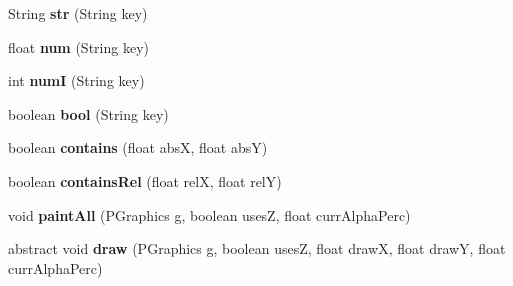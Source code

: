 \begin{DoxyCompactItemize}
\item 
\hypertarget{classhype_1_1drawable_1_1_h_drawable_a0d2393ad2936ee21fbb73fe8044f8c03}{String {\bfseries str} (String key)}\label{classhype_1_1drawable_1_1_h_drawable_a0d2393ad2936ee21fbb73fe8044f8c03}

\item 
\hypertarget{classhype_1_1drawable_1_1_h_drawable_aaafb5307820159466ebf60658c7a325d}{float {\bfseries num} (String key)}\label{classhype_1_1drawable_1_1_h_drawable_aaafb5307820159466ebf60658c7a325d}

\item 
\hypertarget{classhype_1_1drawable_1_1_h_drawable_a78a4cb7304e24e1706d9f23d0a387b43}{int {\bfseries num\-I} (String key)}\label{classhype_1_1drawable_1_1_h_drawable_a78a4cb7304e24e1706d9f23d0a387b43}

\item 
\hypertarget{classhype_1_1drawable_1_1_h_drawable_a138a8d2253dbfccb39889cb01b452f7c}{boolean {\bfseries bool} (String key)}\label{classhype_1_1drawable_1_1_h_drawable_a138a8d2253dbfccb39889cb01b452f7c}

\item 
\hypertarget{classhype_1_1drawable_1_1_h_drawable_a6662671b3f2c3f96cdd8883e0eb21fd6}{boolean {\bfseries contains} (float abs\-X, float abs\-Y)}\label{classhype_1_1drawable_1_1_h_drawable_a6662671b3f2c3f96cdd8883e0eb21fd6}

\item 
\hypertarget{classhype_1_1drawable_1_1_h_drawable_a40eaa02f8f52fc6891d77affe8b8f146}{boolean {\bfseries contains\-Rel} (float rel\-X, float rel\-Y)}\label{classhype_1_1drawable_1_1_h_drawable_a40eaa02f8f52fc6891d77affe8b8f146}

\item 
\hypertarget{classhype_1_1drawable_1_1_h_drawable_a54e5a75afb23f49b37ce769a11d10fb0}{void {\bfseries paint\-All} (P\-Graphics g, boolean uses\-Z, float curr\-Alpha\-Perc)}\label{classhype_1_1drawable_1_1_h_drawable_a54e5a75afb23f49b37ce769a11d10fb0}

\item 
\hypertarget{classhype_1_1drawable_1_1_h_drawable_a8e0af2cfaa89a93b3dab6b5f0ecdf964}{abstract void {\bfseries draw} (P\-Graphics g, boolean uses\-Z, float draw\-X, float draw\-Y, float curr\-Alpha\-Perc)}\label{classhype_1_1drawable_1_1_h_drawable_a8e0af2cfaa89a93b3dab6b5f0ecdf964}

\end{DoxyCompactItemize}
